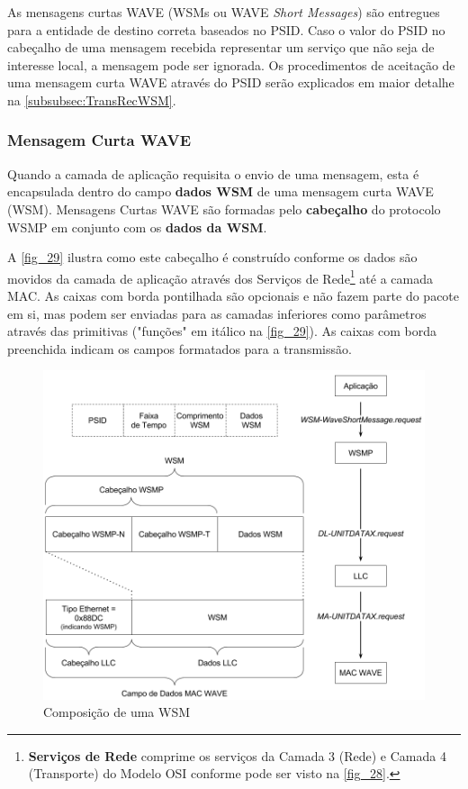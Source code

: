 \documentclass[
12pt,				%
openright,			%
oneside,			%
a4paper,			%
brazil,				%
]{abntex2}
\begin{document}
	\par As mensagens curtas WAVE (WSMs ou WAVE \textit{Short Messages}) são entregues para a entidade de destino correta baseados no PSID. Caso o valor do PSID no cabeçalho de uma mensagem recebida representar um serviço que não seja de interesse local, a mensagem pode ser ignorada. Os procedimentos de aceitação de uma mensagem curta WAVE através do PSID serão explicados em maior detalhe na \autoref{subsubsec:TransRecWSM}.

	\subsubsection{\label{sssec:wsm}Mensagem Curta WAVE}
	
	\par  Quando a camada de aplicação requisita o envio de uma mensagem, esta é encapsulada dentro do campo \textbf{dados WSM} de uma mensagem curta WAVE (WSM). Mensagens Curtas WAVE são formadas pelo \textbf{cabeçalho} do protocolo WSMP em conjunto com os \textbf{dados da WSM}.
	
	\par A \autoref{fig_29} ilustra como este cabeçalho é construído conforme os dados são movidos da camada de aplicação através dos Serviços de Rede{\footnote{\textbf{Serviços de Rede} comprime os serviços da Camada 3 (Rede) e Camada 4 (Transporte) do Modelo OSI conforme pode ser visto na \autoref{fig_28}.}} até a camada MAC. As caixas com borda pontilhada são opcionais e não fazem parte do pacote em si, mas podem ser enviadas para as camadas inferiores como parâmetros através das primitivas ("funções" em itálico na \autoref{fig_29}). As caixas com borda preenchida indicam  os campos formatados para a transmissão.

	\begin{figure} [H]
		\centering
		\includegraphics[scale=.5]{figuras/cap3/29ComposicaoDeUmaWSM}
		\caption{\label{fig_29}Composição de uma WSM}
	\end{figure}
	
\end{document}
